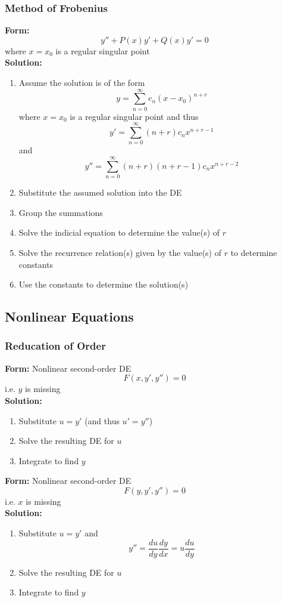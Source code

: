 \documentclass{article}
\begin{document}
\subsubsection{Method of Frobenius}

\textbf{Form:} \[y'' + P(x) y' + Q(x) y' = 0\] where $x = x_0$ is a regular singular point \\ \textbf{Solution:} \begin{enumerate}
  \item Assume the solution is of the form \[y = \sum_{n = 0}^\infty c_n (x - x_0)^{n + r}\] where $x = x_0$ is a regular singular point and thus \[y' = \sum_{n = 0}^\infty (n + r) c_n x^{n + r - 1}\] and \[y'' = \sum_{n = 0}^\infty (n + r) (n + r - 1) c_n x^{n + r - 2}\]

  \item Substitute the assumed solution into the DE

  \item Group the summations

  \item Solve the indicial equation to determine the value(s) of $r$

  \item Solve the recurrence relation(s) given by the value(s) of $r$ to determine constants

  \item Use the constants to determine the solution(s)
\end{enumerate}

\subsection{Nonlinear Equations}

\subsubsection{Reducation of Order}

\textbf{Form:} Nonlinear second-order DE \[F(x, y', y'') = 0\] i.e. $y$ is missing \\ \textbf{Solution:} \begin{enumerate}
  \item Substitute $u = y'$ (and thus $u' = y''$)

  \item Solve the resulting DE for $u$

  \item Integrate to find $y$
\end{enumerate} \textbf{Form:} Nonlinear second-order DE \[F(y, y', y'') = 0\] i.e. $x$ is missing \\ \textbf{Solution:} \begin{enumerate}
  \item Substitute $u = y'$ and \[y'' = \frac{du}{dy} \frac{dy}{dx} = u \frac{du}{dy}\]

  \item Solve the resulting DE for $u$

  \item Integrate to find $y$
\end{enumerate}
\end{document}
